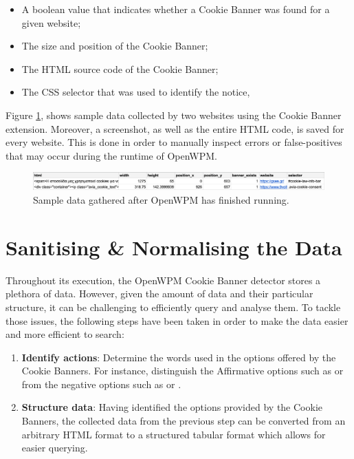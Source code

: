 \documentclass[../main.tex]{subfiles}
\begin{document}
\begin{itemize}
    \item A boolean value that indicates whether a Cookie Banner was found for a given website;
    \item The size and position of the Cookie Banner;
    \item The HTML source code of the Cookie Banner;
    \item The CSS selector that was used to identify the notice, 
\end{itemize}

Figure \ref{fig:impl_openwpm_sample_data}, shows sample data collected by two websites using the Cookie Banner extension. Moreover, a screenshot, as well as the entire HTML code, is saved for every website. This is done in order to manually inspect errors or false-positives that may occur during the runtime of OpenWPM.

\begin{figure}[ht]
    \centering
    \includegraphics[width=\textwidth]{images/implementation/open_wpm_out.png}
    \caption{Sample data gathered after OpenWPM has finished running.}
    \label{fig:impl_openwpm_sample_data}
\end{figure}

\section{Sanitising \& Normalising the Data}
Throughout its execution, the OpenWPM Cookie Banner detector stores a plethora of data. However, given the amount of data and their particular structure, it can be challenging to efficiently query and analyse them. To tackle those issues, the following steps have been taken in order to make the data easier and more efficient to search: 

\begin{enumerate}
    \item \textbf{Identify actions}: Determine the  words used in the options offered by the Cookie Banners. For instance, distinguish the Affirmative options such as  or  from the negative options such as  or .
    
    \item \textbf{Structure data}: Having identified the options provided by the Cookie Banners, the collected data from the previous step can be converted from an arbitrary HTML format to a structured tabular format which allows for easier querying. 
\end{enumerate}
\end{document}
